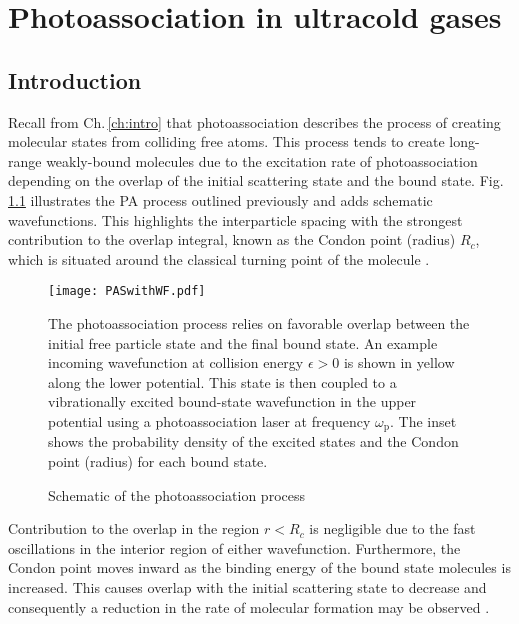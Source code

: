 \chapter{Photoassociation in ultracold gases} \label{ch:chap3}
\section{Introduction} \label{sec:pas_intro}
Recall from Ch.\,\ref{ch:intro} that photoassociation describes the process of creating molecular states from colliding free atoms.
This process tends to create long-range weakly-bound molecules due to the excitation rate of photoassociation depending on the overlap of the initial scattering state and the bound state.
Fig.\,\ref{fig:3pasSch} illustrates the PA process outlined previously and adds schematic wavefunctions.
This highlights the interparticle spacing with the strongest contribution to the overlap integral, known as the Condon point (radius) $R_c$, which is situated around the classical turning point of the molecule \cite{Bohn1999,bav00}.
\begin{figure}
	\centerline{
	\texttt{[image: PASwithWF.pdf]}}
	\caption{Schematic of the photoassociation process}{The photoassociation process relies on favorable overlap between the initial free particle state and the final bound state. An example incoming wavefunction at collision energy $\epsilon > 0$ is shown in yellow along the lower potential. This state is then coupled to a vibrationally excited bound-state wavefunction in the upper potential using a photoassociation laser at frequency $\omega_\text{p}$. The inset shows the probability density of the excited states and the Condon point (radius) for each bound state.}
	\label{fig:3pasSch}
\end{figure}
Contribution to the overlap in the region $r < R_c$ is negligible due to the fast oscillations in the interior region of either wavefunction.
Furthermore, the Condon point moves inward as the binding energy of the bound state molecules is increased. 
This causes overlap with the initial scattering state to decrease and consequently a reduction in the rate of molecular formation may be observed \cite{Krems2009a,Julienne2009a,nse06,Jones2006}.


